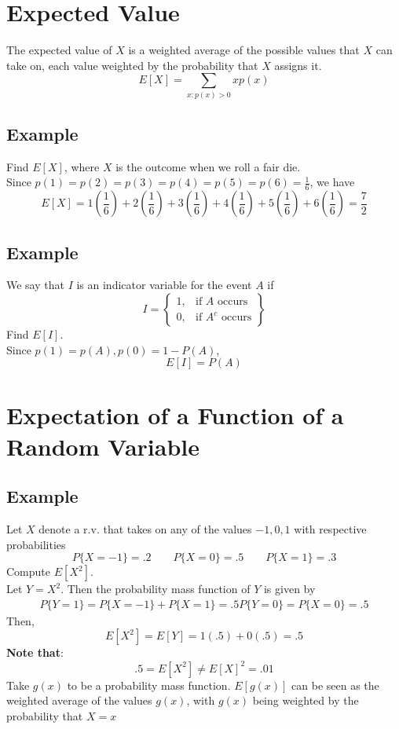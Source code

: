 \section{Expected Value}
\begin{definition}
    The expected value of $X$ is a weighted average of the possible values that $X$ can take on, each value weighted by the probability that $X$ assigns it. 
    \[E[X] = \sum_{x:p(x) > 0} xp(x)\]
\end{definition}
\subsection*{Example}
Find $E[X]$, where $X$ is the outcome when we roll a fair die. \\
Since $p(1) = p(2) = p(3) = p(4) = p(5) = p(6) = \frac{1}{6}$, we have 
\[E[X] = 1\left(\frac{1}{6}\right) + 2\left(\frac{1}{6}\right) + 3\left(\frac{1}{6}\right) + 4\left(\frac{1}{6}\right) + 5\left(\frac{1}{6}\right) + 6\left(\frac{1}{6}\right) = \frac{7}{2}\]
\subsection*{Example}
We say that $I$ is an indicator variable for the event $A$ if 
\begin{equation}
I = 
\left\{
    \begin{array}{lr}
        1, & \text{if } A \text{ occurs}\\
        0, & \text{if } A^c \text{ occurs}
    \end{array}
\right\}
\end{equation}
Find $E[I]$.\\
Since $p(1) = p(A), p(0) = 1 - P(A)$, \[E[I] = P(A)\]
\section{Expectation of a Function of a Random Variable}
\subsection*{Example}
Let $X$ denote a r.v. that takes on any of the values $-1,0,1$ with respective probabilities 
\[P\{X = -1\} = .2\qquad P\{X = 0\} = .5\qquad P\{X = 1\} = .3\]
Compute $E[X^2]$.\\
Let $Y = X^2$. Then the probability mass function of $Y$ is given by 
\begin{equation*}
    \begin{split}
        P\{Y = 1\} = P\{X = -1\} + P\{X = 1\} = .5
        P\{Y = 0\} = P\{X = 0\} = .5
    \end{split}
\end{equation*}
Then, \[E[X^2] = E[Y] = 1(.5) + 0(.5) = .5\]
\textbf{Note that}:
\[.5 = E[X^2]\neq E[X]^2 = .01\]
Take $g(x)$ to be a probability mass function. $E[g(x)]$ can be seen as the weighted average of the values $g(x)$, with $g(x)$ being weighted by the probability that $X = x$
